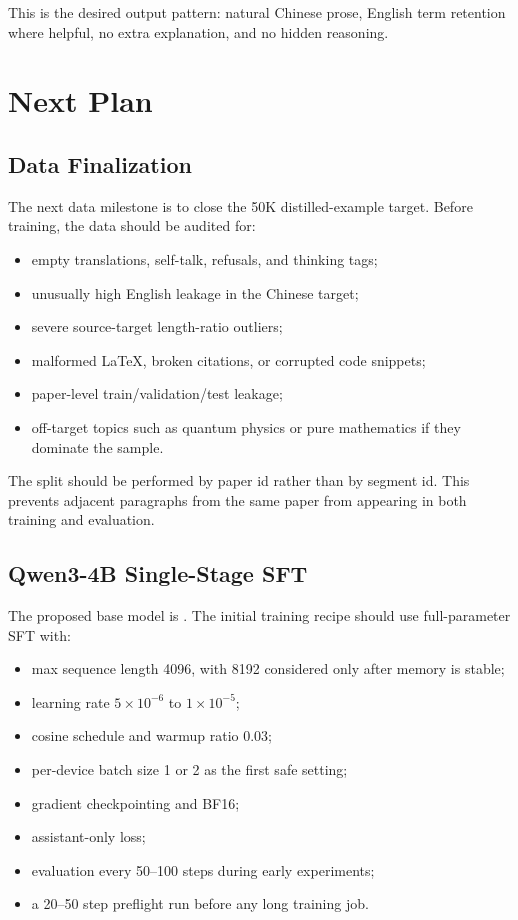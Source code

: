 \documentclass{article}
\begin{document}
This is the desired output pattern: natural Chinese prose, English term retention where helpful, no extra explanation, and no hidden reasoning.

\section{Next Plan}

\subsection{Data Finalization}

The next data milestone is to close the 50K distilled-example target. Before training, the data should be audited for:

\begin{itemize}
    \item empty translations, self-talk, refusals, and thinking tags;
    \item unusually high English leakage in the Chinese target;
    \item severe source-target length-ratio outliers;
    \item malformed LaTeX, broken citations, or corrupted code snippets;
    \item paper-level train/validation/test leakage;
    \item off-target topics such as quantum physics or pure mathematics if they dominate the sample.
\end{itemize}

The split should be performed by paper id rather than by segment id. This prevents adjacent paragraphs from the same paper from appearing in both training and evaluation.

\subsection{Qwen3-4B Single-Stage SFT}

The proposed base model is . The initial training recipe should use full-parameter SFT with:

\begin{itemize}
    \item max sequence length 4096, with 8192 considered only after memory is stable;
    \item learning rate \(5\times10^{-6}\) to \(1\times10^{-5}\);
    \item cosine schedule and warmup ratio 0.03;
    \item per-device batch size 1 or 2 as the first safe setting;
    \item gradient checkpointing and BF16;
    \item assistant-only loss;
    \item evaluation every 50--100 steps during early experiments;
    \item a 20--50 step preflight run before any long training job.
\end{itemize}
\end{document}
